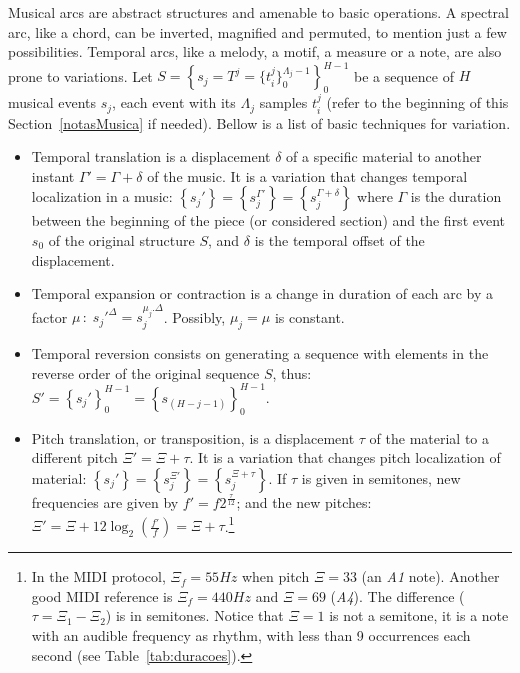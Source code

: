 Musical arcs are abstract structures and amenable to basic operations.
A spectral arc, like a chord, can be inverted, magnified and permuted, to mention just a few possibilities.
Temporal arcs, like a melody, a motif, a measure or a note, are also
prone to variations. Let
$S=\left\{s_j=T^j=\{t_i^{j}\}_0^{\Lambda_j-1}\right\}_0^{H-1}$ be a sequence
of $H$ musical events $s_j$, each event with its $\Lambda_j$ samples $t_i^j$
(refer to the beginning of this Section~\ref{notasMusica} if needed). Bellow is a list of basic techniques
for variation.
\begin{itemize}
        \item Temporal translation is a displacement
    $\delta$ of a specific material to another instant $\Gamma'=\Gamma + \delta$
    of the music. It is a variation that changes temporal localization in
    a music:
    $\left\{s_j'\right\}=\left\{s_j^{\Gamma'}\right\}=\left\{s_j^{\Gamma+\delta}\right\}$
    where $\Gamma$ is the duration between the beginning of the piece (or considered
    section) and the first event $s_0$ of the original structure $S$, and
    $\delta$ is the temporal offset of the displacement.

    \item Temporal expansion or contraction is a change in duration of each
    arc by a factor $\mu\,:\; s_j'^{\Delta}=s_j^{\mu_j . \Delta}$. Possibly,
    $\mu_j=\mu$ is constant.

    \item Temporal reversion consists on generating a sequence with elements
    in the reverse order of the original sequence $S$, thus:
		$S'=\left\{s_j'\right\}_0^{H-1}=\left\{s_{(H-j-1)}\right\}_0^{H-1}$.

    \item Pitch translation, or transposition, is a displacement $\tau$ of the material to a
        different pitch $\Xi'=\Xi + \tau$. It is a variation that changes pitch
        localization of material:
        $\left\{s_j'\right\}=\left\{s_j^{\Xi'}\right\}=\left\{s_j^{\Xi+\tau}\right\}$.
        If $\tau$ is given in semitones, new frequencies are given by $f'=f2^{\frac{\tau}{12}}$; 
        and the new pitches: $\Xi'=\Xi +12 \log_2\left(\frac{f'}{f}\right)=\Xi+\tau$.\footnote{In
		the MIDI protocol, $\Xi_{f}=55Hz$ when pitch $\Xi=33$
	(an \textit{A1} note). Another good MIDI reference is $\Xi_{f}=440Hz$ and
		$\Xi=69$ (\textit{A4}). The difference ($\tau=\Xi_1 - \Xi_2$) is in semitones.
        Notice that $\Xi=1$ is not a semitone, it is a note with an audible frequency as rhythm, with
		less than 9 occurrences each second (see Table~\ref{tab:duracoes}).}


\end{itemize}

